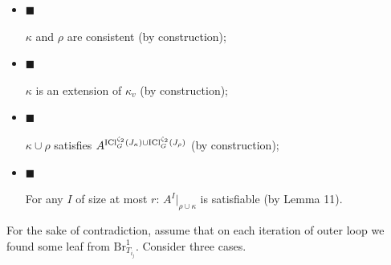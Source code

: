 \documentclass[10pt,a4paper]{article}
\begin{document}
\begin{itemize}


\item[] 
$\blacksquare$ 


$\kappa$ and $\rho$ are consistent (by construction);\par





\item[] 
$\blacksquare$ 


$\kappa$ is an extension of $\kappa_{v}$ (by construction);\par





\item[] 
$\blacksquare$ 


$\kappa\cup\rho$ satisfies $A^{\mathrm{ICl}_{G}^{\zeta_{2}}\left(J_{\kappa}\right)\cup\mathrm{ICl}_{G}^{%
\zeta_{2}}\left(J_{\rho}\right)}$
(by construction);\par





\item[] 
$\blacksquare$ 


For any $I$ of size at most $r$: $A^{I}|_{\rho\cup\kappa}$ is satisfiable (by Lemma
11).\par





\end{itemize}




For the sake of contradiction, assume that on each iteration of outer loop we found some leaf from
$\mathrm{Br}^{1}_{T_{i_{j}}}$. Consider three cases.\par
\end{document}
